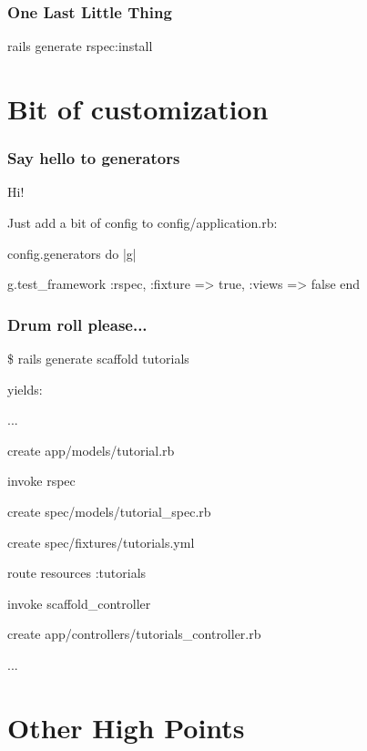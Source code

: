 \documentclass{beamer}
\begin{document}
\begin{frame}
\frametitle{One Last Little Thing}

\begin{semiverbatim}
rails generate rspec:install
\end{semiverbatim}

\end{frame}



\section{Bit of customization}
\begin{frame}
\frametitle{Say hello to generators}
Hi!
\pause

Just add a bit of config to config/application.rb:

\begin{semiverbatim}
config.generators do |g|
      
      g.test\_framework :rspec, :fixture => true, :views => false
end
\end{semiverbatim}

\end{frame}

\begin{frame}
\frametitle{Drum roll please...}
\begin{semiverbatim}
\$ rails generate scaffold tutorials
\end{semiverbatim}
\pause

yields:


\begin{semiverbatim}
      ...
      
      create    app/models/tutorial.rb
      
      invoke    rspec
      
      create      spec/models/tutorial\_spec.rb
      
      create      spec/fixtures/tutorials.yml
      
       route  resources :tutorials
      
      invoke  scaffold\_controller
      
      create    app/controllers/tutorials\_controller.rb
      
      ...
\end{semiverbatim}
\end{frame}

\section{Other High Points}
\end{document}
